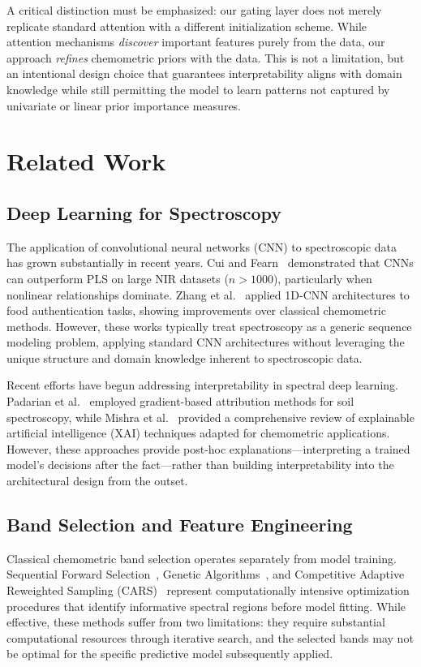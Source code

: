\documentclass[preprint,12pt]{elsarticle}
\begin{document}
A critical distinction must be emphasized: our gating layer does not merely replicate standard attention with a different initialization scheme. While attention mechanisms \textit{discover} important features purely from the data, our approach \textit{refines} chemometric priors with the data. This is not a limitation, but an intentional design choice that guarantees interpretability aligns with domain knowledge while still permitting the model to learn patterns not captured by univariate or linear prior importance measures.

\section{Related Work}

\subsection{Deep Learning for Spectroscopy}

The application of convolutional neural networks (CNN) to spectroscopic data has grown substantially in recent years. Cui and Fearn~\cite{cui2018modern} demonstrated that CNNs can outperform PLS on large NIR datasets ($n>1000$), particularly when nonlinear relationships dominate. Zhang et al.~\cite{zhang2020deep} applied 1D-CNN architectures to food authentication tasks, showing improvements over classical chemometric methods. However, these works typically treat spectroscopy as a generic sequence modeling problem, applying standard CNN architectures without leveraging the unique structure and domain knowledge inherent to spectroscopic data.

Recent efforts have begun addressing interpretability in spectral deep learning. Padarian et al.~\cite{padarian2019using} employed gradient-based attribution methods for soil spectroscopy, while Mishra et al.~\cite{mishra2021trends} provided a comprehensive review of explainable artificial intelligence (XAI) techniques adapted for chemometric applications. However, these approaches provide post-hoc explanations---interpreting a trained model's decisions after the fact---rather than building interpretability into the architectural design from the outset.

\subsection{Band Selection and Feature Engineering}

Classical chemometric band selection operates separately from model training. Sequential Forward Selection~\cite{leardi2000application}, Genetic Algorithms~\cite{xiaobo2010variables}, and Competitive Adaptive Reweighted Sampling (CARS)~\cite{li2009key} represent computationally intensive optimization procedures that identify informative spectral regions before model fitting. While effective, these methods suffer from two limitations: they require substantial computational resources through iterative search, and the selected bands may not be optimal for the specific predictive model subsequently applied.
\end{document}
